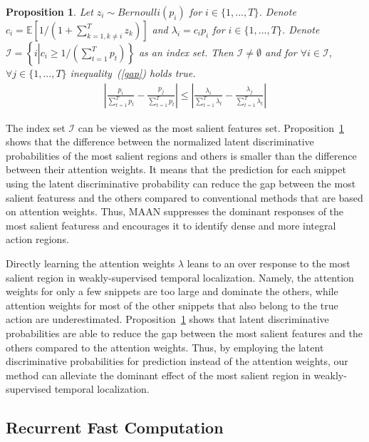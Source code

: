 \documentclass{article} \usepackage{iclr2019_conference,times}
\newtheorem{proposition}{Proposition}
\begin{document}
\begin{proposition}
\label{Re}
Let  $ z_{i} \sim Bernoulli(p_{i}) $  for $i \in \{1,...,T\}$. Denote ${c_i} = \mathbb{E}\left[ {1/(1 + \sum\nolimits_{k = 1,k \ne i}^T {{z_k}} )} \right]$ and $\lambda_i = c_ip_i$  for $i \in \{1,...,T\}$.  Denote $\mathcal{I} = \left\{ {i\left| {{c_i} \ge 1/(\sum\nolimits_{t = 1}^T {{p_t}} )} \right.} \right\}$ as an index set. Then  $\mathcal{I} \ne \emptyset $  and for $\forall i  \in \mathcal{I}$, $\forall j \in \{1,...,T\} $   inequality~(\ref{gap}) holds true. \begin{align}
  \left| {\frac{{{p_i}}}{{\sum\nolimits_{t = 1}^T {{p_t}} }} - \frac{{{p_j}}}{{\sum\nolimits_{t = 1}^T {{p_t}} }}} \right| \le \left| {\frac{{{\lambda _i}}}{{\sum\nolimits_{t = 1}^T {{\lambda _t}} }} - \frac{{{\lambda _j}}}{{\sum\nolimits_{t = 1}^T {{\lambda _t}} }}} \right| \label{gap}  
\end{align}
\end{proposition}
The index set $\mathcal{I}$ can be viewed as the most salient features set.  Proposition~\ref{Re} shows that the difference between the normalized latent discriminative probabilities of the most salient regions and others is smaller than the difference between their attention weights. It means that the prediction for each snippet using the latent discriminative probability can reduce the gap between the most salient featuress and the others compared to conventional methods that are based on attention weights. Thus, MAAN suppresses the dominant responses of the most salient featuress and encourages it to identify dense and more integral action regions.  


Directly learning the attention weights $\lambda$ leans to an over response to the most salient region in weakly-supervised temporal localization. Namely, the attention weights for only a few snippets are too large and dominate the others, while attention weights for most of the other snippets that also belong to the true action are underestimated. Proposition~\ref{Re} shows that latent discriminative probabilities are able to reduce the gap between the most salient features and the others compared to the attention weights. Thus, by employing the latent discriminative probabilities for prediction instead of the attention weights, our method can alleviate the dominant effect of the most salient region in weakly-supervised temporal localization. 






\subsection{Recurrent Fast Computation} ~\label{FastComputation}
\end{document}
